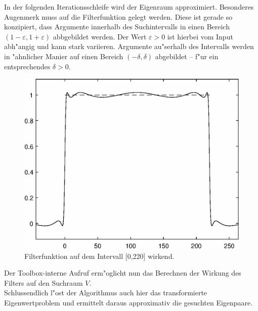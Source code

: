 In der folgenden Iterationsschleife wird der Eigenraum approximiert. Besonderes Augenmerk muss auf die
Filterfunktion  gelegt werden. Diese ist gerade so konzipiert, dass Argumente innerhalb des
Suchintervalls in einen Bereich $(1-\varepsilon, 1+\varepsilon)$ abbgebildet werden. Der Wert $\varepsilon > 0$ ist
hierbei vom Input abh"angig und kann stark variieren. Argumente au"serhalb des Intervalls werden in "ahnlicher
Manier auf einen Bereich $(-\delta, \delta)$ abgebildet -- f"ur ein entsprechendes $\delta > 0$.

\begin{figure}[h!]

    \centering

    \includegraphics{images/epsFig}

    \caption{Filterfunktion  auf dem Intervall [0,220] wirkend.}

\end{figure}

Der Toolbox-interne Aufruf  erm"oglicht nun das Berechnen der Wirkung des Filters
auf den Suchraum $V$.\\

Schlussendlich l"ost der Algorithmus auch hier das transformierte Eigenwertproblem und ermittelt daraus
approximativ die gesuchten Eigenpaare.
